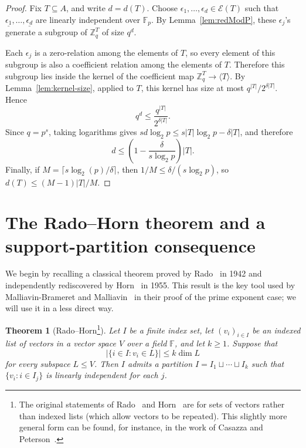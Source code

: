 \documentclass[11pt]{amsart}
\newtheorem{theorem}{Theorem}[section]
\newcommand{\Z}{\mathbb{Z}}
\newcommand{\F}{\mathbb{F}}
\begin{document}
\begin{proof}
Fix \(T\subseteq A\), and write \(d=d(T)\). Choose \(\epsilon_1,\ldots,\epsilon_d\in\mathcal E(T)\) such that \(\underline{\epsilon_1},\ldots,\underline{\epsilon_d}\) are linearly independent over \(\F_p\). By Lemma~\ref{lem:redModP}, these \(\epsilon_j\)'s generate a subgroup of \(\Z_q^T\) of size \(q^d\).

Each \(\epsilon_j\) is a zero-relation among the elements of \(T\), so every element of this subgroup is also a coefficient relation among the elements of \(T\). Therefore this subgroup lies inside the kernel of the coefficient map \(\Z_q^T\to \langle T\rangle\). By Lemma~\ref{lem:kernel-size}, applied to \(T\), this kernel has size at most \(q^{|T|}/2^{\delta |T|}\). Hence
$$
        q^d\leq \frac{q^{|T|}}{2^{\delta |T|}}.
$$
Since \(q=p^s\), taking logarithms gives \(sd\log_2 p\leq s|T|\log_2 p-\delta |T|\), and therefore
$$
        d\leq \left(1-\frac{\delta}{s\log_2 p}\right)|T|.
$$
Finally, if \(M=\lceil s\log_2(p)/\delta\rceil\), then \(1/M\leq \delta/(s\log_2 p)\), so \(d(T)\leq (M-1)|T|/M\).
\end{proof}


\section{The Rado--Horn theorem and a support-partition consequence}

We begin by recalling a classical theorem proved by Rado~\cite{R} in 1942
and independently rediscovered by Horn~\cite{H} in 1955.
This result is the key tool used by Malliavin-Brameret and Malliavin~\cite{MM}
in their proof of the prime exponent case; we will use it in a less direct way.

\begin{theorem}[Rado--Horn\footnote{The original statements of Rado~\cite{R} and Horn~\cite{H} are for sets of vectors rather than indexed lists (which allow vectors to be repeated). This slightly more general form can be found, for instance, in the work of Casazza and Peterson~\cite{CasazzaPeterson2012}.}]
Let $I$ be a finite index set, let $(v_i)_{i \in I}$ be an indexed list of vectors in a vector
space $V$ over a field $\F$, and let $k \geq 1$. Suppose that
$$
|\{i \in I : v_i \in L\}| \leq k \dim L
$$
for every subspace $L \leq V$. Then $I$ admits a partition
$I = I_1 \sqcup \cdots \sqcup I_k$ such that $\{v_i : i \in I_j\}$ is
linearly independent for each $j$.
\end{theorem}
\end{document}
